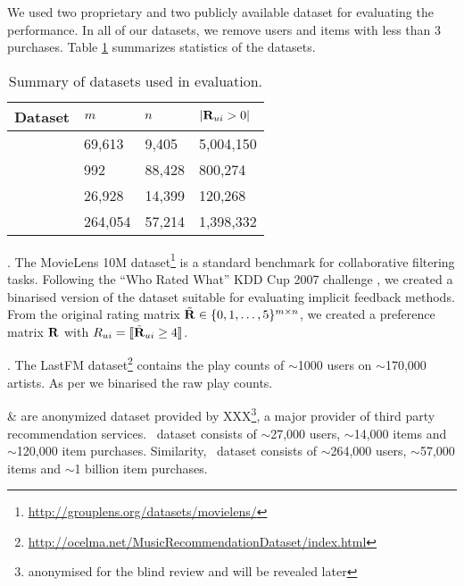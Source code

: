We used two proprietary and two publicly available dataset for evaluating the performance. In all of our datasets, we remove users and items with less than 3 purchases. Table \ref{tbl:datasets} summarizes statistics of the datasets.

\begin{table}
	\centering
	\caption{Summary of datasets used in evaluation.}
	\label{tbl:datasets}
	
	\begin{tabular}{llll}
	\toprule
	\toprule	
	\textbf{Dataset} & $m$ & $n$ & $ | \mathbf{R}_{ui} > 0 | $ \\
	\toprule
	\MLens  & 69,613 & 9,405 & 5,004,150 \\
	\LastFM & 992 & 88,428 & 800,274\\
	\Guitar & 26,928 & 14,399 & 120,268 \\
	\Lowes & 264,054 & 57,214 & 1,398,332 \\
	\bottomrule
	\end{tabular}
\end{table}

\MLens. The MovieLens 10M dataset\footnote{\scriptsize \url{http://grouplens.org/datasets/movielens/}} is a standard benchmark for collaborative filtering tasks.
Following the ``Who Rated What'' KDD Cup 2007 challenge \citep{Bennett:2007}, we created a binarised version of the dataset suitable for evaluating implicit feedback methods.
From the original rating matrix $\tilde{\mathbf{R}} \in \{ 0, 1, \ldots, 5 \}^{m \times n}$, we created a preference matrix $\mathbf{R}$ with $R_{ui} = \llbracket \tilde{\mathbf{R}}_{ui} \geq 4 \rrbracket$.

\LastFM. The LastFM dataset\footnote{{\scriptsize \url{http://ocelma.net/MusicRecommendationDataset/index.html}}} \citep{Celma:2008} contains the play counts of $\sim$1000 users on $\sim$170,000 artists. As per \MLens we binarised the raw play counts.


\Guitar \& \Lowes  are anonymized dataset provided by XXX\footnote{{\scriptsize anonymised for the blind review and will be revealed later}}, a major provider of third party recommendation services. \Guitar \ dataset consists of $\sim$27,000 users, $\sim$14,000 items and $\sim$120,000 item purchases. Similarity, \Lowes \ dataset consists of $\sim$264,000 users, $\sim$57,000 items and $\sim$1 billion item purchases. 


